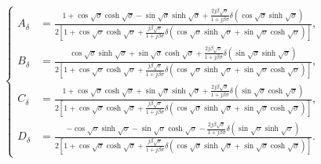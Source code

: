 \documentclass{svjour3}                     %
\begin{document}
\begin{equation}
    \left\{\begin{aligned}
        A_\delta &= \frac{ 1 + \cos\sqrt{\sigma } \cosh\sqrt{\sigma } - \sin\sqrt{\sigma } \sinh\sqrt{\sigma} + \frac{2 j \beta \sqrt{\sigma}}{ 1+ j \beta \sigma } \delta \left( \cos\sqrt{\sigma } \sinh\sqrt{\sigma } \right)}{2 \left[ 1 + \cos\sqrt{\sigma } \cosh\sqrt{\sigma } + \frac{j \beta \sqrt{\sigma}}{ 1+ j \beta \sigma } \delta \left( \cos\sqrt{\sigma } \sinh\sqrt{\sigma } + \sin\sqrt{\sigma } \cosh\sqrt{\sigma } \right) \right]}, \\
        B_\delta &= \frac{ \cos\sqrt{\sigma } \sinh\sqrt{\sigma } + \sin\sqrt{\sigma } \cosh\sqrt{\sigma} + \frac{2 j \beta \sqrt{\sigma}}{ 1+ j \beta \sigma } \delta \left( \sin\sqrt{\sigma } \sinh\sqrt{\sigma } \right)}{2 \left[ 1 + \cos\sqrt{\sigma } \cosh\sqrt{\sigma } + \frac{j \beta \sqrt{\sigma}}{ 1+ j \beta \sigma } \delta \left( \cos\sqrt{\sigma } \sinh\sqrt{\sigma } + \sin\sqrt{\sigma } \cosh\sqrt{\sigma } \right) \right]}, \\
        C_\delta &= \frac{ 1 + \cos\sqrt{\sigma } \cosh\sqrt{\sigma } + \sin\sqrt{\sigma } \sinh\sqrt{\sigma} + \frac{2 j \beta \sqrt{\sigma}}{ 1+ j \beta \sigma } \delta \left( \sin\sqrt{\sigma } \cosh\sqrt{\sigma } \right)}{2 \left[ 1 + \cos\sqrt{\sigma } \cosh\sqrt{\sigma } + \frac{j \beta \sqrt{\sigma}}{ 1+ j \beta \sigma } \delta \left( \cos\sqrt{\sigma } \sinh\sqrt{\sigma } + \sin\sqrt{\sigma } \cosh\sqrt{\sigma } \right) \right]}, \\
        D_\delta &= \frac{ -\cos\sqrt{\sigma } \sinh\sqrt{\sigma } - \sin\sqrt{\sigma } \cosh\sqrt{\sigma} -  \frac{2 j \beta \sqrt{\sigma}}{ 1+ j \beta \sigma } \delta \left( \sin\sqrt{\sigma } \sinh\sqrt{\sigma } \right)}{2 \left[ 1 + \cos\sqrt{\sigma } \cosh\sqrt{\sigma } + \frac{j \beta \sqrt{\sigma}}{ 1+ j \beta \sigma } \delta \left( \cos\sqrt{\sigma } \sinh\sqrt{\sigma } + \sin\sqrt{\sigma } \cosh\sqrt{\sigma } \right) \right]}.
    \end{aligned}\right.
    \label{eq:eq_disp_func_coeffs_exps}
\end{equation}
\end{document}

